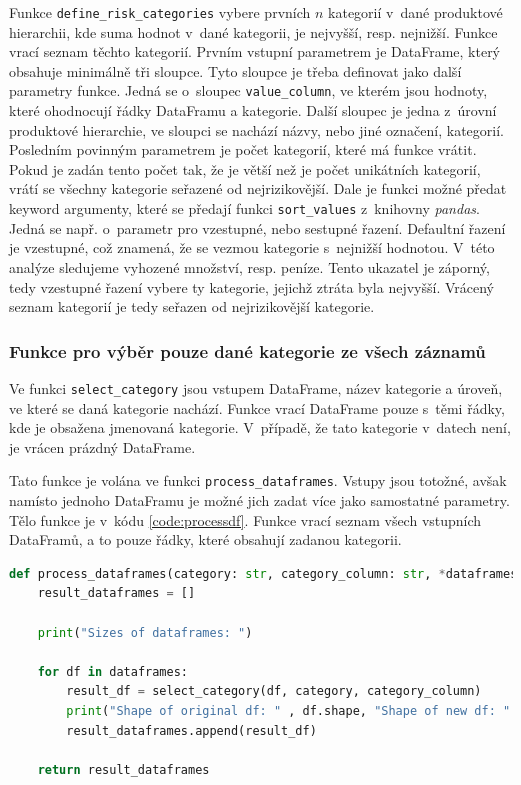 Funkce \texttt{define\_risk\_categories} vybere prvních $n$ kategorií v~dané produktové hierarchii, kde suma hodnot v~dané kategorii, je nejvyšší, resp. nejnižší. Funkce vrací seznam těchto kategorií. Prvním vstupní parametrem je DataFrame, který obsahuje minimálně tři sloupce. Tyto sloupce je třeba definovat jako další parametry funkce. Jedná se o~sloupec \texttt{value\_column}, ve kterém jsou hodnoty, které ohodnocují řádky DataFramu a kategorie. Další sloupec je jedna z~úrovní produktové hierarchie, ve sloupci se nachází názvy, nebo jiné označení, kategorií. Posledním povinným parametrem je počet kategorií, které má funkce vrátit. Pokud je zadán tento počet tak, že je větší než je počet unikátních kategorií, vrátí se všechny kategorie seřazené od nejrizikovější. Dale je funkci možné předat keyword argumenty, které se předají funkci \texttt{sort\_values} z~knihovny \emph{pandas}. Jedná se např. o~parametr pro vzestupné, nebo sestupné řazení. Defaultní řazení je vzestupné, což znamená, že se vezmou kategorie s~nejnižší hodnotou. V~této analýze sledujeme vyhozené množství, resp. peníze. Tento ukazatel je záporný, tedy vzestupné řazení vybere ty kategorie, jejichž ztráta byla nejvyšší. Vrácený seznam kategorií je tedy seřazen od nejrizikovější kategorie.

\subsubsection*{Funkce pro výběr pouze dané kategorie ze všech záznamů}
Ve funkci \texttt{select\_category} jsou vstupem DataFrame, název kategorie a úroveň, ve které se daná kategorie nachází. Funkce vrací DataFrame pouze s~těmi řádky, kde je obsažena jmenovaná kategorie. V~případě, že tato kategorie v~datech není, je vrácen prázdný DataFrame.

Tato funkce je volána ve funkci \texttt{process\_dataframes}. Vstupy jsou totožné, avšak namísto jednoho DataFramu je možné jich zadat více jako samostatné parametry. Tělo funkce je v~kódu \ref*{code:processdf}. Funkce vrací seznam všech vstupních DataFramů, a to pouze řádky, které obsahují zadanou kategorii.

\begin{lstlisting}[language=Python,style=mystyle, label={code:processdf},  caption={Funkce pro výběr pouze dané katageorie z~více DataFramů.}]
def process_dataframes(category: str, category_column: str, *dataframes) -> list[pd.DataFrame]:
    result_dataframes = []

    print("Sizes of dataframes: ")

    for df in dataframes:
        result_df = select_category(df, category, category_column)
        print("Shape of original df: " , df.shape, "Shape of new df: " , result_df.shape)
        result_dataframes.append(result_df)

    return result_dataframes
\end{lstlisting}


